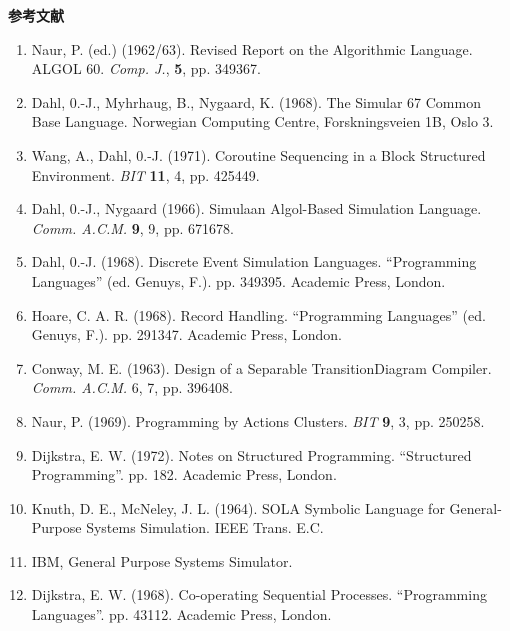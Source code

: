 \bigskip

\noindent
\textbf{参考文献}
\medskip\nopagebreak

\begin{enumerate}[leftmargin=*, itemsep=.1em, wide=0pt, align=left, label=(\arabic*)]
	\item \label{ref:1}
	Naur, P. (ed.) (1962/63). Revised Report on the Algorithmic Language. ALGOL 60. \textit{Comp. J.}, \textbf{5}, pp. 349\textendash{}367.
	
	\item \label{ref:2}
	Dahl, 0.-J., Myhrhaug, B., Nygaard, K. (1968). The Simular 67 Common Base Language. Norwegian Computing Centre, Forskningsveien 1B, Oslo 3.
	
	\item \label{ref:3}
	Wang, A., Dahl, 0.-J. (1971). Coroutine Sequencing in a Block Structured Environment. \textit{BIT} \textbf{11}, 4, pp. 425\textendash{}449.
	
	\item \label{ref:4}
	Dahl, 0.-J., Nygaard (1966). Simula\textemdash{}an Algol-Based Simulation Language. \textit{Comm. A.C.M.} \textbf{9}, 9, pp. 671\textendash{}678. 
	
	\item \label{ref:5}
	Dahl, 0.-J. (1968). Discrete Event Simulation Languages. ``Programming Languages'' (ed. Genuys, F.). pp. 349\textendash{}395. Academic Press, London.
	
	\item \label{ref:6}
	Hoare, C. A. R. (1968). Record Handling. ``Programming Languages'' (ed. Genuys, F.). pp. 291\textendash{}347. Academic Press, London.
	
	\item \label{ref:7}
	Conway, M. E. (1963). Design of a Separable Transition\textemdash{}Diagram Compiler. \textit{Comm. A.C.M.} 6, 7, pp. 396\textendash{}408.
	
	\item \label{ref:8}
	Naur, P. (1969). Programming by Actions Clusters. \textit{BIT} \textbf{9}, 3, pp. 250\textendash{}258.
	
	\item \label{ref:9}
	Dijkstra, E. W. (1972). Notes on Structured Programming. ``Structured Programming''. pp. 1\textendash{}82. Academic Press, London.
	
	\item \label{ref:10}
	Knuth, D. E., McNeley, J. L. (1964). SOL\textemdash{}A Symbolic Language for General-Purpose Systems Simulation. IEEE Trans. E.C.
	
	\item \label{ref:11}
	IBM, General Purpose Systems Simulator.
	
	\item \label{ref:12}
	Dijkstra, E. W. (1968). Co-operating Sequential Processes. ``Programming Languages''. pp. 43\textendash{}112. Academic Press, London.
\end{enumerate}

